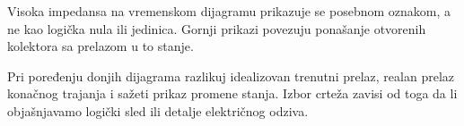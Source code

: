 Visoka impedansa na vremenskom dijagramu prikazuje se posebnom oznakom, a ne kao logička nula ili jedinica. Gornji prikazi povezuju ponašanje otvorenih kolektora sa prelazom u to stanje.

Pri poređenju donjih dijagrama razlikuj idealizovan trenutni prelaz, realan prelaz konačnog trajanja i sažeti prikaz promene stanja. Izbor crteža zavisi od toga da li objašnjavamo logički sled ili detalje električnog odziva.
